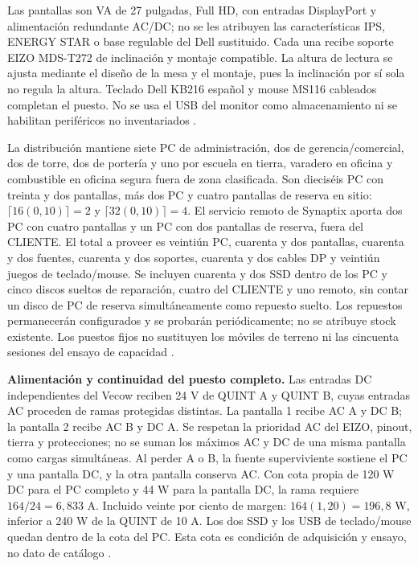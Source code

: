 Las pantallas son VA de 27 pulgadas, Full HD, con entradas DisplayPort y alimentación redundante AC/DC; no se les atribuyen las características IPS, ENERGY STAR o base regulable del Dell sustituido. Cada una recibe soporte EIZO MDS-T272 de inclinación y montaje compatible. La altura de lectura se ajusta mediante el diseño de la mesa y el montaje, pues la inclinación por sí sola no regula la altura. Teclado Dell KB216 español y mouse MS116 cableados completan el puesto. No se usa el USB del monitor como almacenamiento ni se habilitan periféricos no inventariados \parencites{p6-puestos-eizo,p6-puestos-eizo-soporte,p4-dell-teclado,p4-dell-mouse}.

La distribución mantiene siete PC de administración, dos de gerencia/comercial, dos de torre, dos de portería y uno por escuela en tierra, varadero en oficina y combustible en oficina segura fuera de zona clasificada. Son dieciséis PC con treinta y dos pantallas, más dos PC y cuatro pantallas de reserva en sitio: $\lceil16(0,10)\rceil=2$ y $\lceil32(0,10)\rceil=4$. El servicio remoto de Synaptix aporta dos PC con cuatro pantallas y un PC con dos pantallas de reserva, fuera del CLIENTE. El total a proveer es veintiún PC, cuarenta y dos pantallas, cuarenta y dos fuentes, cuarenta y dos soportes, cuarenta y dos cables DP y veintiún juegos de teclado/mouse. Se incluyen cuarenta y dos SSD dentro de los PC y cinco discos sueltos de reparación, cuatro del CLIENTE y uno remoto, sin contar un disco de PC de reserva simultáneamente como repuesto suelto. Los repuestos permanecerán configurados y se probarán periódicamente; no se atribuye stock existente. Los puestos fijos no sustituyen los móviles de terreno ni las cincuenta sesiones del ensayo de capacidad \parencites[cap.~2, secc.~2.4; cap.~14]{caso07}[secc.~8.4]{pucv-transversal}.

\textbf{Alimentación y continuidad del puesto completo.} Las entradas DC independientes del Vecow reciben 24 V de QUINT A y QUINT B, cuyas entradas AC proceden de ramas protegidas distintas. La pantalla 1 recibe AC A y DC B; la pantalla 2 recibe AC B y DC A. Se respetan la prioridad AC del EIZO, pinout, tierra y protecciones; no se suman los máximos AC y DC de una misma pantalla como cargas simultáneas. Al perder A o B, la fuente superviviente sostiene el PC y una pantalla DC, y la otra pantalla conserva AC. Con cota propia de 120 W DC para el PC completo y 44 W para la pantalla DC, la rama requiere $164/24=6,833$ A. Incluido veinte por ciento de margen: $164(1,20)=196,8$ W, inferior a 240 W de la QUINT de 10 A. Los dos SSD y los USB de teclado/mouse quedan dentro de la cota del PC. Esta cota es condición de adquisición y ensayo, no dato de catálogo \parencites{p6-puestos-quint,p6-puestos-eizo}[p.~15]{p6-puestos-eizo-setup}.

